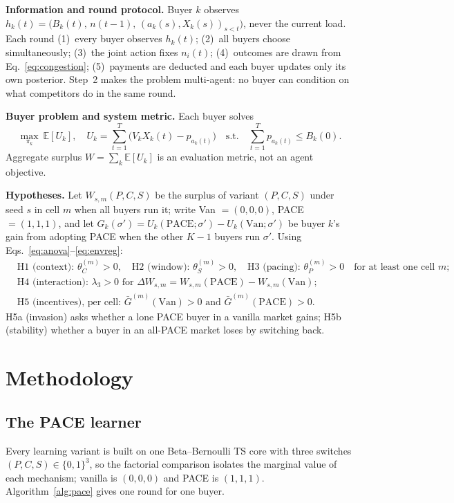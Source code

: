 \documentclass{article}
\begin{document}
\textbf{Information and round protocol.} Buyer $k$ observes $h_k(t)=\big(B_k(t),\,n(t-1),\,(a_k(s),X_k(s))_{s<t}\big)$, never the current load. Each round (1)~every buyer observes $h_k(t)$; (2)~all buyers choose simultaneously; (3)~the joint action fixes $n_i(t)$; (4)~outcomes are drawn from Eq.~\eqref{eq:congestion}; (5)~payments are deducted and each buyer updates only its own posterior. Step~2 makes the problem multi-agent: no buyer can condition on what competitors do in the same round.

\textbf{Buyer problem and system metric.} Each buyer solves
\begin{equation}
\max_{\pi_k}\ \mathbb{E}[U_k],\quad U_k=\sum_{t=1}^{T}\big(V_kX_k(t)-p_{a_k(t)}\big)\quad\text{s.t.}\quad\sum_{t=1}^{T}p_{a_k(t)}\le B_k(0).
\end{equation}
Aggregate surplus $W=\sum_k\mathbb E[U_k]$ is an evaluation metric, not an agent objective.

\textbf{Hypotheses.} Let $W_{s,m}(P,C,S)$ be the surplus of variant $(P,C,S)$ under seed $s$ in cell $m$ when all buyers run it; write Van $=(0,0,0)$, PACE $=(1,1,1)$, and let $G_k(\sigma')=U_k(\mathrm{PACE};\sigma')-U_k(\mathrm{Van};\sigma')$ be buyer $k$'s gain from adopting PACE when the other $K-1$ buyers run $\sigma'$. Using Eqs.~\eqref{eq:anova}--\eqref{eq:envreg}:
\begin{align*}
&\text{H1 (context): } \theta_C^{(m)}>0,\quad \text{H2 (window): } \theta_S^{(m)}>0,\quad \text{H3 (pacing): } \theta_P^{(m)}>0 \quad\text{for at least one cell } m;\\
&\text{H4 (interaction): } \lambda_3>0 \text{ for } \Delta W_{s,m}=W_{s,m}(\mathrm{PACE})-W_{s,m}(\mathrm{Van});\\
&\text{H5 (incentives), per cell: } \bar G^{(m)}(\mathrm{Van})>0 \text{ and } \bar G^{(m)}(\mathrm{PACE})>0.
\end{align*}
H5a (invasion) asks whether a lone PACE buyer in a vanilla market gains; H5b (stability) whether a buyer in an all-PACE market loses by switching back.

\section{Methodology}
\label{sec:method}
\subsection{The PACE learner}
\label{sec:algorithms}
Every learning variant is built on one Beta--Bernoulli TS core with three switches $(P,C,S)\in\{0,1\}^3$, so the factorial comparison isolates the marginal value of each mechanism; vanilla is $(0,0,0)$ and PACE is $(1,1,1)$. Algorithm~\ref{alg:pace} gives one round for one buyer.
\end{document}
